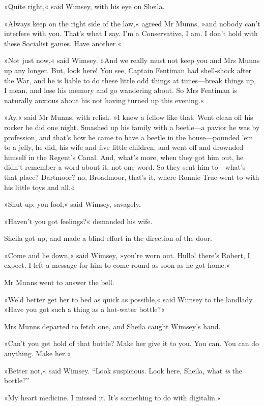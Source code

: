 »Quite right,« said Wimsey, with his eye on Sheila.

»Always keep on the right side of the law,« agreed Mr Munns, »and nobody can't interfere with you. That's what I say. I'm a Conservative, I am. I don't hold with these Socialist games. Have another.«

»Not just now,« said Wimsey. »And we really must not keep you and Mrs Munns up any longer. But, look here! You see, Captain Fentiman had shell-shock after the War, and he is liable to do these little odd things at times\allowbreak---\allowbreak break things up, I mean, and lose his memory and go wandering about. So Mrs Fentiman is naturally anxious about his not having turned up this evening.«

»Ay,« said Mr Munns, with relish. »I knew a fellow like that. Went clean off his rocker he did one night. Smashed up his family with a beetle\allowbreak---\allowbreak a pavior he was by profession, and that's how he came to have a beetle in the house\allowbreak---\allowbreak pounded 'em to a jelly, he did, his wife and five little children, and went off and drownded himself in the Regent's Canal. And, what's more, when they got him out, he didn't remember a word about it, not one word. So they sent him to\allowbreak---\allowbreak what's that place? Dartmoor? no, Broadmoor, that's it, where Ronnie True went to with his little toys and all.«

»Shut up, you fool,« said Wimsey, savagely.

»Haven't you got feelings?« demanded his wife.

Sheila got up, and made a blind effort in the direction of the door.

»Come and lie down,« said Wimsey, »you're worn out. Hullo! there's Robert, I expect. I left a message for him to come round as soon as he got home.«

Mr Munns went to answer the bell.

»We'd better get her to bed as quick as possible,« said Wimsey to the landlady. »Have you got such a thing as a hot-water bottle?«

Mrs Munns departed to fetch one, and Sheila caught Wimsey's hand.

»Can't you get hold of that bottle? Make her give it to you. You can. You can do anything. Make her.«

»Better not,« said Wimsey. \enquote{Look suspicious. Look here, Sheila, what \textit{is} the bottle?}

»My heart medicine. I missed it. It's something to do with digitalin.«

